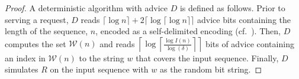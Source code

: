 \documentclass[a4paper]{article}
\begin{document}
\begin{proof}
A deterministic algorithm with advice $D$ is defined as follows. Prior to serving a request, $D$ reads $\lceil \log n \rceil + 2 \lceil \log \lceil \log n \rceil \rceil$ advice bits containing the length of the sequence, $n$, encoded as a self-delimited encoding (cf.~\cite{BockKKR14}). Then, $D$ computes the set $\mathcal{W}(n)$ and reads $\left \lceil \log \left\lceil \frac{\log I(n)}{\log (\delta)}\right\rceil\right\rceil$ bits of advice containing an index in $\mathcal{W}(n)$ to the string $w$ that covers the input sequence. Finally, $D$ simulates $R$ on the input sequence with $w$ as the random bit string.
\end{proof}
\end{document}

